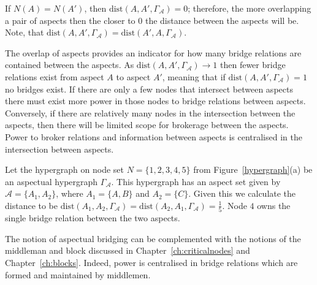 If $N(A) = N(A')$, then $\mbox{dist}(A, A', \Gamma_{\mathcal{A}}) = 0$; therefore, the more overlapping a pair of aspects then the closer to $0$ the distance between the aspects will be. Note, that $\mbox{dist}(A, A',\Gamma_{\mathcal{A}}) = \mbox{dist}(A', A,\Gamma_{\mathcal{A}})$.

The overlap of aspects provides an indicator for how many bridge relations are contained between the aspects. As $\mbox{dist}(A, A',\Gamma_{\mathcal{A}}) \rightarrow 1$ then fewer bridge relations exist from aspect $A$ to aspect $A'$, meaning that if $\mbox{dist}(A, A',\Gamma_{\mathcal{A}}) = 1$ no bridges exist. If there are only a few nodes that intersect between aspects there must exist more power in those nodes to bridge relations between aspects. Conversely, if there are relatively many nodes in the intersection between the aspects, then there will be limited scope for brokerage between the aspects. Power to broker relations and information between aspects is centralised in the intersection between aspects.

\begin{example} \label{ex:dist}
Let the hypergraph on node set $N = \{1,2,3,4,5\}$ from Figure~\ref{hypergraph}(a) be an aspectual hypergraph $\Gamma_{\mathcal{A}}$. This hypergraph has an aspect set given by $\mathcal{A} = \{A_{1}, A_{2} \}$, where $A_{1} = \{A,B\}$ and $A_{2} = \{C\}$. Given this we calculate the distance to be $\mbox{dist}(A_{1}, A_{2}, \Gamma_{\mathcal{A}}) = \mbox{dist}(A_{2}, A_{1}, \Gamma_{\mathcal{A}}) = \frac{1}{5}$. Node $4$ owns the single bridge relation between the two aspects.
\end{example}

The notion of aspectual bridging can be complemented with the notions of the middleman and block discussed in Chapter~\ref{ch:criticalnodes} and Chapter~\ref{ch:blocks}. Indeed, power is centralised in bridge relations which are formed and maintained by middlemen.

